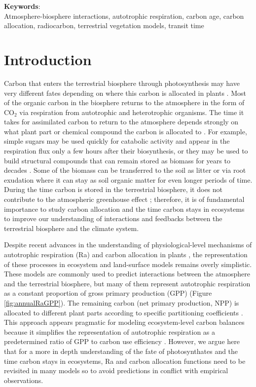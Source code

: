 \documentclass[12pt, a4paper]{article}
\begin{document}
\noindent
\textbf{Keywords}: \\
Atmosphere-biosphere interactions, autotrophic respiration, carbon age, carbon allocation, radiocarbon, terrestrial vegetation models, transit time

\section{Introduction}
Carbon that enters the terrestrial biosphere through photosynthesis may have very different fates depending on where this carbon is allocated in plants \citep{Trumbore2006}. Most of the organic carbon in the biosphere returns to the atmosphere in the form of CO$_2$ via respiration from autotrophic and heterotrophic organisms. The time it takes for assimilated carbon to return to the atmosphere depends strongly on what plant part or chemical compound the carbon is allocated to \citep{Rasmussen2016, Luo2017, Lu2018, Herrera2020}. For example, simple sugars may be used quickly for catabolic activity and appear in the respiration flux only a few hours after their biosynthesis, or they may be used to build structural compounds that can remain stored as biomass for years to decades \citep{Hartmann2016}. Some of the biomass can be transferred to the soil as litter or via root exudation where it can stay as soil organic matter for even longer periods of time. During the time carbon is stored in the terrestrial biosphere, it does not contribute to the atmospheric greenhouse effect \citep{Neubauer2015,Sierra2021BGS}; therefore, it is of fundamental importance to study carbon allocation and the time carbon stays in ecosystems to improve our understanding of interactions and feedbacks between the terrestrial biosphere and the climate system. 

Despite recent advances in the understanding of physiological-level mechanisms of autotrophic respiration (Ra) and carbon allocation in plants \citep{Hartmann2016}, the representation of these processes in ecosystem and land-surface models remains overly simplistic. These models are commonly used to predict interactions between the atmosphere and the terrestrial biosphere, but many of them represent autotrophic respiration as a constant proportion of gross primary production (GPP) (Figure \ref{fig:annualRaGPP}). The remaining carbon (net primary production, NPP) is allocated to different plant parts according to specific partitioning coefficients \citep{Franklin2012, Ceballos2020}. This approach appears pragmatic for modeling ecosystem-level carbon balances because it simplifies the representation of autotrophic respiration as a predetermined ratio of GPP to carbon use efficiency \citep{DeLucia2007}. However, we argue here that for a more in depth understanding of the fate of photosynthates and the time carbon stays in ecosystems, Ra and carbon allocation functions need to be revisited in many models so to avoid predictions in conflict with empirical observations. 
\end{document}
